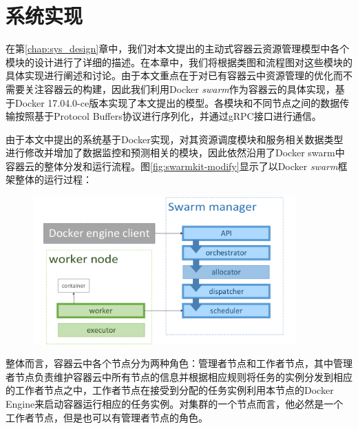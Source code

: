 
\chapter{系统实现}\label{chap:sys_impl}
在第\ref{chap:sys_design}章中，我们对本文提出的主动式容器云资源管理模型中各个模块的设计进行了详细的描述。在本章中，我们将根据类图和流程图对这些模块的具体实现进行阐述和讨论。由于本文重点在于对已有容器云中资源管理的优化而不需要关注容器云的构建，因此我们利用Docker \emph{swarm}作为容器云的具体实现，基于Docker 17.04.0-ce版本实现了本文提出的模型。各模块和不同节点之间的数据传输按照基于Protocol Buffers协议进行序列化，并通过gRPC接口进行通信。

由于本文中提出的系统基于Docker实现，对其资源调度模块和服务相关数据类型进行修改并增加了数据监控和预测相关的模块，因此依然沿用了Docker swarm中容器云的整体分发和运行流程。图\ref{fig:swarmkit-modify}显示了以Docker \emph{swarm}框架整体的运行过程：
\begin{figure}[htbp]
\centering
\includegraphics[width=0.9\textwidth]{./figure/modification}
\end{figure} 

整体而言，容器云中各个节点分为两种角色：管理者节点和工作者节点，其中管理者节点负责维护容器云中所有节点的信息并根据相应规则将任务的实例分发到相应的工作者节点之中，工作者节点在接受到分配的任务实例利用本节点的Docker Engine来启动容器运行相应的任务实例。对集群的一个节点而言，他必然是一个工作者节点，但是也可以有管理者节点的角色。

